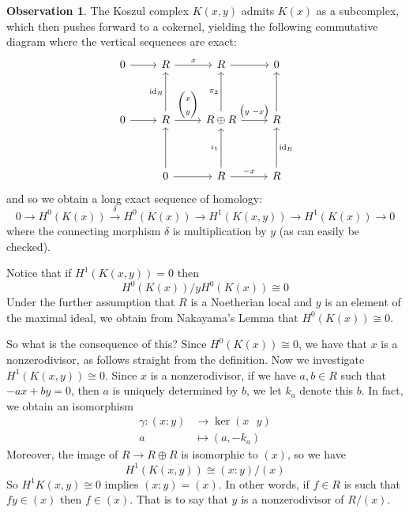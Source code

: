 \documentclass[12pt]{article}
\theoremstyle{plain}
\theoremstyle{definition}
\newtheorem{observation}[thm]{Observation}
\newcommand{\lto}{\longrightarrow}
\begin{document}
\begin{observation}\label{obs:koszul_reg}
The Koszul complex $K(x,y)$ admits $K(x)$ as a subcomplex, which then pushes forward to a cokernel, yielding the following commutative diagram where the vertical sequences are exact:
\begin{equation}\label{eq:sub_quotient}
\begin{tikzcd}[row sep = huge]
0\arrow[r] & R\arrow[r,"{x}"] & R\arrow[r] & 0\\
0\arrow[r] & R\arrow[u,"{\operatorname{id}_R}"]\arrow[r,"{\begin{pmatrix}
x\\
y
\end{pmatrix}
}"] & R \oplus R\arrow[r,"{\begin{pmatrix}
y \text{  } -x
\end{pmatrix}
}"]\arrow[u,"{\pi_2}"] & R\arrow[u]\\
& 0\arrow[u]\arrow[r] & R\arrow[r,"{-x}"]\arrow[u,"{\iota_1}"] & R\arrow[u,swap,"{\operatorname{id}_R}"]
\end{tikzcd}
\end{equation}
and so we obtain a long exact sequence of homology:
\begin{equation}
0\lto H^0(K(x)) \stackrel{\delta}{\lto} H^0(K(x)) \lto H^1(K(x,y)) \lto H^1(K(x))\lto 0
\end{equation}
where the connecting morphism $\delta$ is multiplication by $y$ (as can easily be checked).

Notice that if $H^1(K(x,y))=0$ then
\begin{equation}
H^0(K(x))/yH^0(K(x)) \cong 0
\end{equation}
Under the further assumption that $R$ is a Noetherian local and $y$ is an element of the maximal ideal, we obtain from Nakayama's Lemma that $H^0(K(x)) \cong 0$.

So what is the consequence of this? Since $H^0(K(x)) \cong 0$, we have that $x$ is a nonzerodivisor, as follows straight from the definition. Now we investigate $H^1(K(x,y)) \cong 0$. Since $x$ is a nonzerodivisor, if we have $a,b \in R$ such that $-ax + by = 0$, then $a$ is uniquely determined by $b$, we let $k_a$ denote this $b$. In fact, we obtain an isomorphism
\begin{align*}
\gamma: (x:y) &\lto \operatorname{ker}(x\text{ }y)\\
a &\longmapsto (a,-k_a)
\end{align*}
Moreover, the image of $R \lto R \oplus R$ is isomorphic to $(x)$, so we have
\begin{equation}
H^1(K(x,y)) \cong (x:y)/(x)
\end{equation}
So $H^1K(x,y) \cong 0$ implies $(x:y) = (x)$. In other words, if $f \in R$ is such that $fy \in (x)$ then $f \in (x)$. That is to say that $y$ is a nonzerodivisor of $R/(x)$.
\end{observation}
\end{document}
